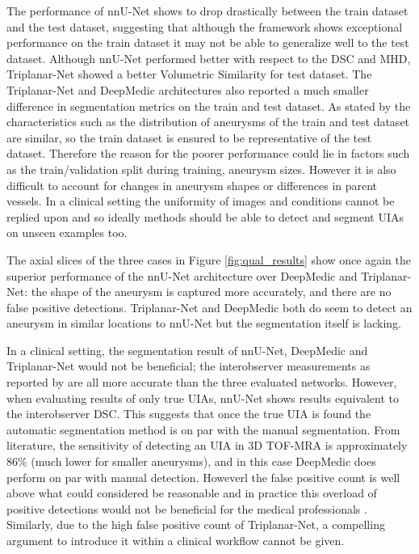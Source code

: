 The performance of nnU-Net shows to drop drastically between the train dataset and the test dataset, suggesting that although the framework shows exceptional performance on the train dataset it may not be able to generalize well to the test dataset. Although nnU-Net performed better with respect to the DSC and MHD, Triplanar-Net showed a better Volumetric Similarity for test dataset. The Triplanar-Net and DeepMedic architectures also reported a much smaller difference in segmentation metrics on the train and test dataset. As stated by \citeauthor{Timmins2020} the characteristics such as the distribution of aneurysms of the train and test dataset are similar, so the train dataset is ensured to be representative of the test dataset. Therefore the reason for the poorer performance could lie in factors such as the train/validation split during training, aneurysm sizes. However it is also difficult to account for changes in aneurysm shapes or differences in parent vessels. In a clinical setting the uniformity of images and conditions cannot be replied upon and so ideally methods should be able to detect and segment UIAs on unseen examples too.

The axial slices of the three cases in Figure \ref{fig:qual_results} show once again the superior performance of the nnU-Net architecture over DeepMedic and Triplanar-Net: the shape of the aneurysm is captured more accurately, and there are no false positive detections. Triplanar-Net and DeepMedic both do seem to detect an aneurysm in similar locations to nnU-Net but the segmentation itself is lacking.

In a clinical setting, the segmentation result of nnU-Net, DeepMedic and Triplanar-Net would not be beneficial; the interobserver measurements as reported by \citeauthor{Timmins2020} are all more accurate than the three evaluated networks. However, when evaluating results of only true UIAs, nnU-Net shows results equivalent to the interobserver DSC. This suggests that once the true UIA is found the automatic segmentation method is on par with the manual segmentation. From literature, the sensitivity of detecting an UIA in 3D TOF-MRA is approximately 86\% (much lower for smaller aneurysms), and in this case DeepMedic does perform on par with manual detection. Howeverl the false positive count is well above what could considered be reasonable and in practice this overload of positive detections would not be beneficial for the medical professionals \citeauthor{Sailer2014, White2001}. Similarly, due to the high false positive count of Triplanar-Net, a compelling argument to introduce it within a clinical workflow cannot be given.

